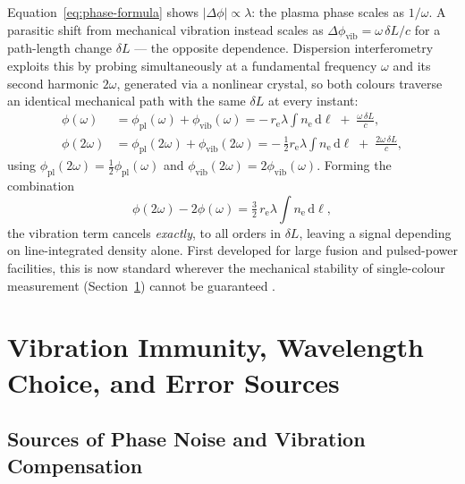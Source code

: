 Equation~\eqref{eq:phase-formula} shows $|\Delta\phi| \propto \lambda$: the plasma phase scales as $1/\omega$. A parasitic shift from mechanical vibration instead scales as $\Delta\phi_{\mathrm{vib}} = \omega\,\delta L/c$ for a path-length change $\delta L$ — the opposite dependence. Dispersion interferometry exploits this by probing simultaneously at a fundamental frequency $\omega$ and its second harmonic $2\omega$, generated via a nonlinear crystal, so both colours traverse an identical mechanical path with the same $\delta L$ at every instant:
\begin{align}
\phi(\omega) &= \phi_{\mathrm{pl}}(\omega) + \phi_{\mathrm{vib}}(\omega)
= -\, r_{\mathrm{e}}\lambda \int n_{\mathrm{e}}\,\mathrm{d}\ell \;+\; \frac{\omega\,\delta L}{c}, \\
\phi(2\omega) &= \phi_{\mathrm{pl}}(2\omega) + \phi_{\mathrm{vib}}(2\omega)
= -\, \tfrac{1}{2} r_{\mathrm{e}}\lambda \int n_{\mathrm{e}}\,\mathrm{d}\ell \;+\; \frac{2\omega\,\delta L}{c},
\end{align}
using $\phi_{\mathrm{pl}}(2\omega) = \tfrac{1}{2}\phi_{\mathrm{pl}}(\omega)$ and $\phi_{\mathrm{vib}}(2\omega) = 2\phi_{\mathrm{vib}}(\omega)$. Forming the combination
\begin{equation}
\phi(2\omega) - 2\phi(\omega) = \tfrac{3}{2}\, r_{\mathrm{e}}\lambda \int n_{\mathrm{e}}\,\mathrm{d}\ell,
\label{eq:dispersion-interf}
\end{equation}
the vibration term cancels \emph{exactly}, to all orders in $\delta L$, leaving a signal depending on line-integrated density alone. First developed for large fusion and pulsed-power facilities, this is now standard wherever the mechanical stability of single-colour measurement (Section~\ref{sec:interf-vibration}) cannot be guaranteed \cite{ref0417}.

\section{Vibration Immunity, Wavelength Choice, and Error Sources}
\label{sec:interf-vibration}

\subsection{Sources of Phase Noise and Vibration Compensation}

